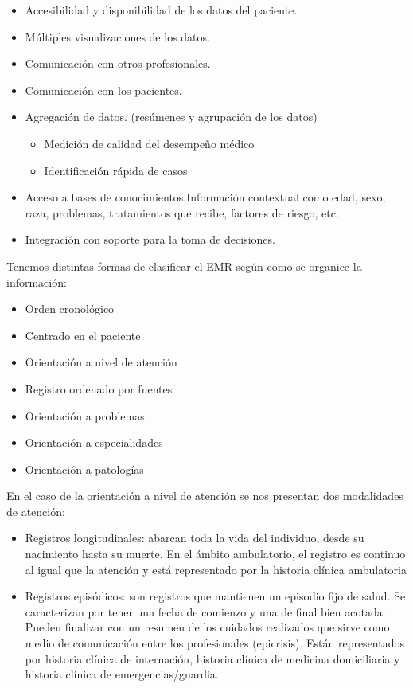     \begin{itemize}
		\item Accesibilidad y disponibilidad de los datos del paciente.
		\item Múltiples visualizaciones de los datos.
		\item Comunicación con otros profesionales.
		\item Comunicación con los pacientes.
		\item Agregación de datos. (resúmenes y agrupación de los datos)
        \begin{itemize}
			\item Medición de calidad del desempeño médico
			\item Identificación rápida de casos
		\end{itemize}
		\item Acceso a bases de conocimientos.Información contextual como edad, sexo, raza, problemas, tratamientos que recibe, factores de riesgo, etc.
		\item Integración con soporte para la toma de decisiones.
	\end{itemize}
Tenemos distintas formas de clasificar el EMR según como se organice la información:
\begin{itemize}
	\item Orden cronológico
	\item Centrado en el paciente
	\item Orientación a nivel de atención
	\item Registro ordenado por fuentes
	\item Orientación a problemas
	\item Orientación a especialidades
	\item Orientación a patologías
\end{itemize}
En el caso de la orientación a nivel de atención se nos presentan dos modalidades de atención:
\begin{itemize}
	\item Registros longitudinales: abarcan toda la vida del individuo, desde su nacimiento hasta su muerte. En el ámbito ambulatorio, el registro es continuo al igual que la atención y está representado por la historia clínica ambulatoria
    \item Registros episódicos: son registros que mantienen un episodio fijo de salud. Se caracterizan por tener una fecha de comienzo y una de final bien acotada. Pueden finalizar con un resumen de los cuidados realizados que sirve como medio de comunicación entre los profesionales (epicrisis). Están representados por historia clínica de internación, historia clínica de medicina domiciliaria y historia clínica de emergencias/guardia.
\end{itemize}


